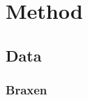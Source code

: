 \documentclass[10pt, a4paper]{article}
\begin{document}



\section{Method}


\subsection{Data}

\subsubsection{Braxen}
\end{document}
